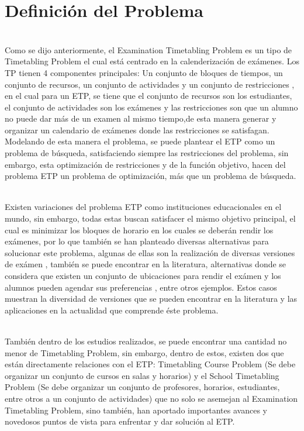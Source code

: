 \section{Definici\'on del Problema} \label{Definición}
\\
Como se dijo anteriormente, el Examination Timetabling Problem es un tipo de Timetabling Problem el cual está centrado en la calenderización de exámenes. Los TP tienen 4 componentes principales: Un conjunto de bloques de tiempos, un conjunto de recursos, un conjunto de actividades y un conjunto de restricciones \cite{Cita5}, en el cual para un ETP, se tiene que el conjunto de recursos son los estudiantes, el conjunto de actividades son los exámenes y las restricciones son que un alumno no puede dar más de un examen al mismo tiempo,de esta manera generar y organizar un calendario de exámenes donde las restricciones se satisfagan. Modelando de esta manera el problema, se puede plantear el ETP como un problema de búsqueda, satisfaciendo siempre las restricciones del problema, sin embargo, esta optimización de restricciones y de la función objetivo, hacen del problema ETP un problema de optimización, más que un problema de búsqueda.
\begin{itemize}
\end{itemize}
\\
Existen variaciones del problema ETP como instituciones educacionales en el mundo, sin embargo, todas estas buscan satisfacer el mismo objetivo principal, el cual es minimizar los bloques de horario en los cuales se deberán rendir los exámenes, por lo que también se han planteado diversas alternativas para solucionar este problema, algunas de ellas son la realización de diversas versiones de exámen \cite{Cita1}, también se puede encontrar en la literatura, alternativas donde se considera que existen un conjunto de ubicaciones para rendir el exámen y los alumnos pueden agendar sus preferencias \cite{Cita6}, entre otros ejemplos. Estos casos muestran la diversidad de versiones que se pueden encontrar en la literatura y las aplicaciones en la actualidad que comprende éste problema.
\begin{itemize}
\end{itemize}
\\
También dentro de los estudios realizados, se puede encontrar una cantidad no menor de Timetabling Problem, sin embargo, dentro de estos, existen dos que están directamente relaciones con el ETP: Timetabling Course Problem (Se debe organizar un conjunto de cursos en salas y horarios) y el School Timetabling Problem (Se debe organizar un conjunto de profesores, horarios, estudiantes, entre otros a un conjunto de actividades) que no solo se asemejan al Examination Timetabling Problem, sino también, han aportado importantes avances y novedosos puntos de vista para enfrentar y dar solución al ETP.
